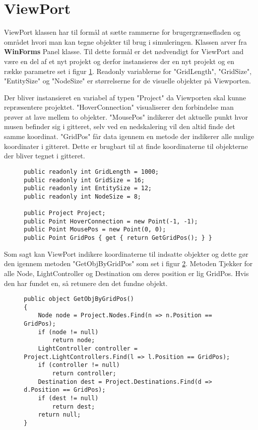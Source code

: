 \section{ViewPort}\label{ViewPort}

ViewPort klassen har til formål at sætte rammerne for brugergrænsefladen og området hvori man kan tegne objekter til brug i simuleringen. Klassen arver fra \textbf{WinForms} Panel klasse. Til dette formål er det nødvendigt for ViewPort and være en del af et nyt projekt og derfor instansieres der en nyt projekt og en række parametre set i figur \ref{ViewportParameters}. Readonly variablerne for "GridLength", "GridSize", "EntitySize" og "NodeSize" er størrelserne for de visuelle objekter på Viewporten.

\vspace{5mm}

Der bliver instansieret en variabel af typen "Project" da Viewporten skal kunne repræsentere projektet. "HoverConnection" visualiserer den forbindelse man prøver at lave mellem to objekter. "MousePos" indikerer det aktuelle punkt hvor musen befinder sig i gitteret, selv ved en nedskalering vil den altid finde det samme koordinat. "GridPos" får data igennem en metode der indikerer alle mulige koordinater i gitteret. Dette er brugbart til at finde koordinaterne til objekterne der bliver tegnet i gitteret.

\begin{figure}[H]
\begin{lstlisting}
public readonly int GridLength = 1000;
public readonly int GridSize = 16;
public readonly int EntitySize = 12;
public readonly int NodeSize = 8;

public Project Project;
public Point HoverConnection = new Point(-1, -1);
public Point MousePos = new Point(0, 0);
public Point GridPos { get { return GetGridPos(); } }
\end{lstlisting}
\caption{}
\label{ViewportParameters}
\end{figure}

Som sagt kan ViewPort indikere koordinaterne til indsatte objekter og dette gør den igennem metoden "GetObjByGridPos" som set i figur \ref{ViewportGetObjByGridPos}. Metoden Tjekker for alle Node, LightController og Destination om deres position er lig GridPos. Hvis den har fundet en, så retunere den det fundne objekt.

\begin{figure}
\begin{lstlisting}
public object GetObjByGridPos()
{
	Node node = Project.Nodes.Find(n => n.Position == GridPos);
	if (node != null)
		return node;
	LightController controller = Project.LightControllers.Find(l => l.Position == GridPos);
	if (controller != null)
		return controller;
	Destination dest = Project.Destinations.Find(d => d.Position == GridPos);
	if (dest != null)
		return dest;
	return null;
}
\end{lstlisting}
\caption{}
\label{ViewportGetObjByGridPos}
\end{figure}

